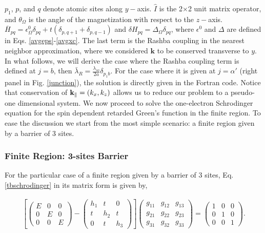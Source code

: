 \documentclass[10pt,prb,showpacs,amssymb,floatfix]{revtex4-1}
\newcommand{\para}{\parallel}
\newcommand{\alp}{\alpha}
\newcommand{\dlt}{\delta}
\newcommand{\Dlt}{\Delta}
\newcommand{\eps}{\epsilon}
\newcommand{\lam}{\lambda}
\newcommand{\Og}{\Omega}
\begin{document}
$p_1$, $p$, and $q$ denote atomic sites along $y-$axis. ${\hat I}$ is the 2$\times$2 unit matrix operator, and $\theta_\Og$ is the angle of the magnetization with respect to the $z-$axis. $\overline{H}_{pq} = \eps^0_\Og\dlt_{pq} + t(\dlt_{p,q+1}+\dlt_{p,q-1})$ and $\dlt H_{pq}= \Dlt_\Og \dlt_{pq}$, where $\eps^0$ and $\Dlt$ are defined in Eqs. \eqref{avgeps}-\eqref{avgxc}.
The last term is the Rashba coupling in the nearest neighbor approximation, where we considered $\bm k$ to be conserved transverse to $y$. In what follows, we will derive the case where the Rashba coupling term is defined at $j=b$, then $\bar{\lam}_R = \frac{\lam_{so}}{2a}\dlt_{p_1b}$. For the case where it is given at $j=\alp'$ (right panel in Fig. \ref{junction}), the solution is directly given in the Fortran code.
Notice that conservation of ${\bf k}_\para = (k_x,k_z)$ allows us to reduce our problem to a pseudo-one dimensional system. We now proceed to solve the one-electron Schrodinger equation for the spin dependent retarded Green's function in the finite region. To ease the discussion we start from the most simple scenario: a finite region given by a barrier of 3 sites.

\subsubsection{Finite Region: 3-sites Barrier}
 For the particular case of a finite region given by a barrier of 3 sites, Eq. \eqref{tbschrodinger} in its matrix form is given by,


\begin{align}
 \left[ \left(\begin{array}{ccc} 
E    &  0 & 0 \\
0 &  E & 0 \\
 0 & 0 & E
\end{array}\right) -
 \left(\begin{array}{ccc} 
h_1   &  t & 0 \\
t &  h_2 & t \\
 0 & t & h_3
\end{array}\right) \right] 
 \left(\begin{array}{ccc} 
g_{11}   &  g_{12} & g_{13} \\
g_{21} &  g_{22} & g_{23} \\
g_{31} & g_{32} & g_{33} 
\end{array}\right) =  
 \left(\begin{array}{ccc} 
 1   &  0 & 0 \\
0 &  1 & 0 \\
 0 & 0 & 1 
\end{array}\right). 
\label{mat}
\end{align}
\end{document}

